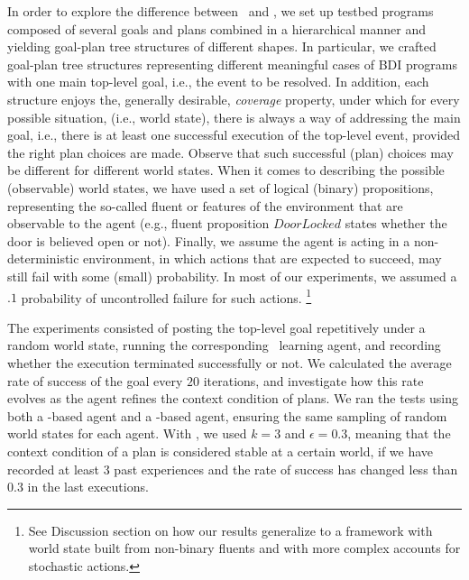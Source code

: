 In order to explore the difference between \BUL\ and \CL, we set up testbed
programs composed of several goals and plans combined in a hierarchical manner
and yielding goal-plan tree structures of different shapes. In particular, we
crafted goal-plan tree structures representing different meaningful cases of BDI
programs with one main top-level goal, i.e., the event to be resolved. In
addition, each structure enjoys the, generally desirable, \emph{coverage}
property, under which for every possible situation, (i.e., world state), there is
always a way of addressing the main goal, i.e., there is at least one successful
execution of the top-level event, provided the right plan choices are made.
Observe that such successful (plan) choices may be different for different world
states.
When it comes to describing the possible (observable) world states, we have used
a set of logical (binary) propositions, representing the so-called fluent or
features of the environment that are observable to the agent (e.g., fluent
proposition $\mathit{DoorLocked}$ states whether the door is believed open or
not).
Finally, we assume the agent is acting in a non-deterministic environment, in
which actions that are expected to succeed, may still fail with some (small)
probability. In most of our experiments, we assumed a $.1$ probability of
uncontrolled failure for such actions. \footnote{See Discussion section on how
our results generalize to a framework with world state built from non-binary
fluents and with more complex accounts for stochastic actions.}




The experiments consisted of posting the top-level goal repetitively
under a random world state, running the corresponding \JACK\ learning
agent, and recording whether the execution terminated successfully or
not. We calculated the average rate of success of the goal every  $20$
iterations, and investigate how this rate evolves as the agent refines
the context condition of plans. 
%
We ran the tests using both a \BUL-based agent and a \CL-based
agent, ensuring the same sampling of random world states for each
agent. 
%
With \BUL, we used $k=3$ and $\epsilon=0.3$, meaning that
the context condition of a plan is considered stable at a certain
world, if we have recorded at least $3$ past experiences and the rate
of success has changed less than $0.3$ in the last executions.
%

